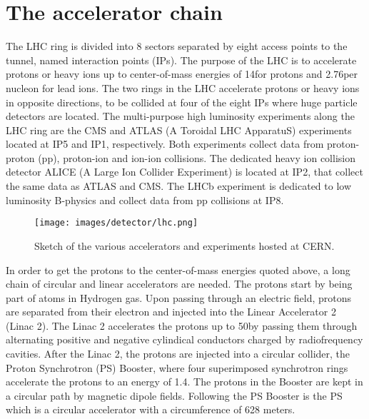 \section{The accelerator chain}
\noindent\justify
The LHC ring is divided into 8 sectors separated by eight access points to the tunnel, named interaction points (IPs). 
The purpose of the LHC is to accelerate protons or heavy ions up to center-of-mass energies of 14\TeV for protons and 2.76\TeV per nucleon for lead ions. 
The two rings in the LHC accelerate protons or heavy ions in opposite directions, to be collided at four of the eight IPs where huge particle detectors are located.
The multi-purpose high luminosity experiments along the LHC ring are the CMS \cite{Chatrchyan:2008aa} and ATLAS (A Toroidal LHC ApparatuS) \cite{Armstrong:1994it} experiments located at IP5 and IP1, respectively. 
Both experiments collect data from proton-proton (pp), proton-ion and ion-ion collisions.
The dedicated heavy ion collision detector ALICE (A Large Ion Collider Experiment) \cite{alice} is located at IP2, that collect the same data as ATLAS and CMS. 
The LHCb \cite{CERN-LHCC-98-004} experiment is dedicated to low luminosity B-physics and collect data from pp collisions at IP8.                                  
\noindent
\justify
\begin{figure}[!htp]
  \centering
   \texttt{[image: images/detector/lhc.png]}
   \caption{Sketch of the various accelerators and experiments hosted at CERN.}
   \label{fig:LHC}
\end{figure}                                                                                                                                                                                    
In order to get the protons to the center-of-mass energies quoted above, a long chain of circular and linear accelerators are needed. 
The protons start by being part of atoms in Hydrogen gas. 
Upon passing through an electric field, protons are separated from their electron and injected into the Linear Accelerator 2 (Linac 2). 
The Linac 2 accelerates the protons up to 50\MeV by passing them through alternating positive and negative cylindical conductors charged by radiofrequency cavities. 
After the Linac 2, the protons are injected into a circular collider, the Proton Synchrotron (PS) Booster, where four superimposed synchrotron rings accelerate the protons to an energy of 1.4\GeV. 
The protons in the Booster are kept in a circular path by magnetic dipole fields.
Following the PS Booster is the PS which is a circular accelerator with a circumference of 628 meters. 
